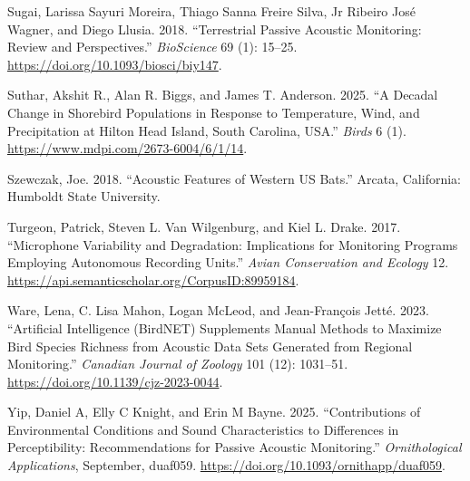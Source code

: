 \documentclass[
  letterpaper,
  DIV=11,
  numbers=noendperiod]{scrartcl}
\newlength{\cslhangindent}
\newenvironment{CSLReferences}[2] %
 {\begin{list}{}{%
  \setlength{\itemindent}{0pt}
  \setlength{\leftmargin}{0pt}
  \setlength{\parsep}{0pt}
  \ifodd #1
   \setlength{\leftmargin}{\cslhangindent}
   \setlength{\itemindent}{-1\cslhangindent}
  \fi
  \setlength{\itemsep}{#2\baselineskip}}}
 {\end{list}}
\begin{document}
\begin{CSLReferences}{1}{0}
Sugai, Larissa Sayuri Moreira, Thiago Sanna Freire Silva, Jr Ribeiro
José Wagner, and Diego Llusia. 2018. {``{Terrestrial Passive Acoustic
Monitoring: Review and Perspectives}.''} \emph{BioScience} 69 (1):
15--25. \url{https://doi.org/10.1093/biosci/biy147}.

Suthar, Akshit R., Alan R. Biggs, and James T. Anderson. 2025. {``A
Decadal Change in Shorebird Populations in Response to Temperature,
Wind, and Precipitation at Hilton Head Island, South Carolina, USA.''}
\emph{Birds} 6 (1). \url{https://www.mdpi.com/2673-6004/6/1/14}.

Szewczak, Joe. 2018. {``Acoustic Features of Western US Bats.''} Arcata,
California: Humboldt State University.

Turgeon, Patrick, Steven L. Van Wilgenburg, and Kiel L. Drake. 2017.
{``Microphone Variability and Degradation: Implications for Monitoring
Programs Employing Autonomous Recording Units.''} \emph{Avian
Conservation and Ecology} 12.
\url{https://api.semanticscholar.org/CorpusID:89959184}.

Ware, Lena, C. Lisa Mahon, Logan McLeod, and Jean-François Jetté. 2023.
{``Artificial Intelligence (BirdNET) Supplements Manual Methods to
Maximize Bird Species Richness from Acoustic Data Sets Generated from
Regional Monitoring.''} \emph{Canadian Journal of Zoology} 101 (12):
1031--51. \url{https://doi.org/10.1139/cjz-2023-0044}.

Yip, Daniel A, Elly C Knight, and Erin M Bayne. 2025. {``Contributions
of Environmental Conditions and Sound Characteristics to Differences in
Perceptibility: Recommendations for Passive Acoustic Monitoring.''}
\emph{Ornithological Applications}, September, duaf059.
\url{https://doi.org/10.1093/ornithapp/duaf059}.

\end{CSLReferences}
\end{document}
